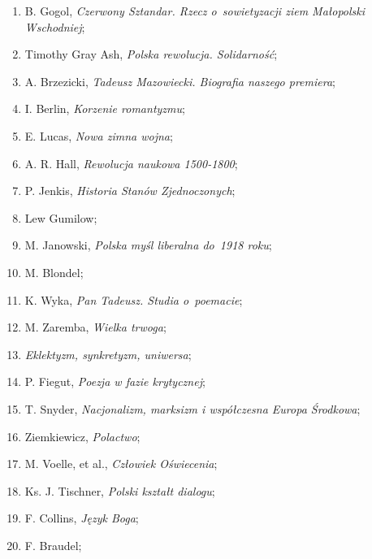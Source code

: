\documentclass[a4paper,11pt]{article}
\begin{document}
\begin{enumerate}
\item B. Gogol, \textit{Czerwony Sztandar. Rzecz o~sowietyzacji ziem
    Małopolski Wschodniej};

\item Timothy Gray Ash, \textit{Polska rewolucja. Solidarność};

\item A. Brzezicki, \textit{Tadeusz Mazowiecki. Biografia naszego
    premiera};

\item I. Berlin, \textit{Korzenie romantyzmu};

\item E. Lucas, \textit{Nowa zimna wojna};

\item A. R. Hall, \textit{Rewolucja naukowa 1500-1800};

\item P. Jenkis, \textit{Historia Stanów Zjednoczonych};

\item Lew Gumilow;

\item M. Janowski, \textit{Polska myśl liberalna do~1918 roku};

\item M. Blondel;

\item K. Wyka, \textit{Pan Tadeusz. Studia o~poemacie};

\item M. Zaremba, \textit{Wielka trwoga};

\item \textit{Eklektyzm, synkretyzm, uniwersa};

\item P. Fiegut, \textit{Poezja w fazie krytycznej};

\item T. Snyder, \textit{Nacjonalizm, marksizm i współczesna Europa
    Środkowa};

\item Ziemkiewicz, \textit{Polactwo};

\item M. Voelle, et al., \textit{Człowiek Oświecenia};

\item Ks. J. Tischner, \textit{Polski kształt dialogu};

\item F. Collins, \textit{Język Boga};

\item F. Braudel;


\end{enumerate}
\end{document}
